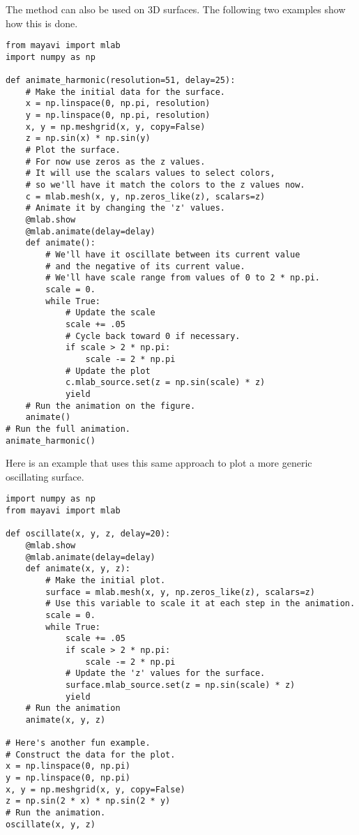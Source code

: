 The  method can also be used on 3D surfaces.
The following two examples show how this is done.
\begin{lstlisting}
from mayavi import mlab
import numpy as np

def animate_harmonic(resolution=51, delay=25):
    # Make the initial data for the surface.
    x = np.linspace(0, np.pi, resolution)
    y = np.linspace(0, np.pi, resolution)
    x, y = np.meshgrid(x, y, copy=False)
    z = np.sin(x) * np.sin(y)
    # Plot the surface.
    # For now use zeros as the z values.
    # It will use the scalars values to select colors,
    # so we'll have it match the colors to the z values now.
    c = mlab.mesh(x, y, np.zeros_like(z), scalars=z)
    # Animate it by changing the 'z' values.
    @mlab.show
    @mlab.animate(delay=delay)
    def animate():
        # We'll have it oscillate between its current value
        # and the negative of its current value.
        # We'll have scale range from values of 0 to 2 * np.pi.
        scale = 0.
        while True:
            # Update the scale
            scale += .05
            # Cycle back toward 0 if necessary.
            if scale > 2 * np.pi:
                scale -= 2 * np.pi
            # Update the plot
            c.mlab_source.set(z = np.sin(scale) * z)
            yield
    # Run the animation on the figure.
    animate()
# Run the full animation.
animate_harmonic()
\end{lstlisting}

Here is an example that uses this same approach to plot a more generic oscillating surface.
\begin{lstlisting}
import numpy as np
from mayavi import mlab

def oscillate(x, y, z, delay=20):
    @mlab.show
    @mlab.animate(delay=delay)
    def animate(x, y, z):
        # Make the initial plot.
        surface = mlab.mesh(x, y, np.zeros_like(z), scalars=z)
        # Use this variable to scale it at each step in the animation.
        scale = 0.
        while True:
            scale += .05
            if scale > 2 * np.pi:
                scale -= 2 * np.pi
            # Update the 'z' values for the surface.
            surface.mlab_source.set(z = np.sin(scale) * z)
            yield
    # Run the animation
    animate(x, y, z)

# Here's another fun example.
# Construct the data for the plot.
x = np.linspace(0, np.pi)
y = np.linspace(0, np.pi)
x, y = np.meshgrid(x, y, copy=False)
z = np.sin(2 * x) * np.sin(2 * y)
# Run the animation.
oscillate(x, y, z)
\end{lstlisting}

